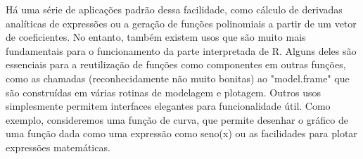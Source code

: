     Há uma série de aplicações padrão dessa facilidade, como cálculo de derivadas analíticas de expressões ou a geração de funções polinomiais a partir de um vetor de coeficientes.
    No entanto, também existem usos que são muito mais fundamentais para o funcionamento da parte interpretada de R. Alguns deles são essenciais para a reutilização de funções como componentes em outras funções, como as chamadas (reconhecidamente não muito bonitas) ao "model.frame" que são construídas em várias rotinas de modelagem e plotagem. Outros usos simplesmente permitem interfaces elegantes para funcionalidade útil. Como exemplo, consideremos uma função de curva, que permite desenhar o gráfico de uma função dada como uma expressão como seno(x) ou as facilidades para plotar expressões matemáticas.
